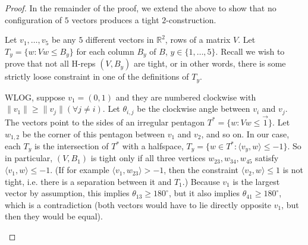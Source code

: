 \documentclass[anon,12pt]{colt2019}
\newcommand{\reals}{\mathbb{R}}
\newcommand{\X}{\mathcal{X}}
\newcommand{\Y}{\mathcal{Y}}
\newcommand{\inprod}[2]{\langle #1, #2 \rangle}%
\begin{document}
\begin{proof}
In the remainder of the proof, we extend the above to show that no configuration of $5$ vectors produces a tight $2$-construction.

Let $v_1,\dots,v_5$ be any $5$ different vectors in $\reals^2$, rows of a matrix $V$.
Let $T_y = \{w : Vw \leq B_y\}$ for each column $B_y$ of $B$, $y\in\{1,\dots,5\}$.
Recall we wish to prove that not all H-reps $(V,B_y)$ are tight, or in other words, there is some strictly loose constraint in one of the definitions of $T_y$.

WLOG, suppose $v_1 = (0,1)$ and they are numbered clockwise with $\|v_1\| \geq \|v_j\| (\forall j \neq i)$.
Let $\theta_{i,j}$ be the clockwise angle between $v_i$ and $v_j$.
The vectors point to the sides of an irregular pentagon $T^* = \{w : Vw \leq \vec{1}\}$.
Let $w_{1,2}$ be the corner of this pentagon between $v_1$ and $v_2$, and so on.
In our case, each $T_y$ is the intersection of $T^*$ with a halfspace, $T_y = \{w \in T^* : \inprod{v_y}{w} \leq -1\}$.
So in particular, $(V,B_1)$ is tight only if all three vertices $w_{23},w_{34},w_{45}$ satisfy $\inprod{v_1}{w} \leq -1$.
(If for example $\inprod{v_1}{w_{23}} > -1$, then the constraint $\inprod{v_2}{w} \leq 1$ is not tight, i.e. there is a separation between it and $T_1$.)
Because $v_1$ is the largest vector by assumption, this implies $\theta_{13} \geq 180^{\circ}$, but it also implies $\theta_{41} \geq 180^{\circ}$, which is a contradiction (both vectors would have to lie directly opposite $v_1$, but then they would be equal).

\begin{center}
\end{center}
\end{proof}
\end{document}
